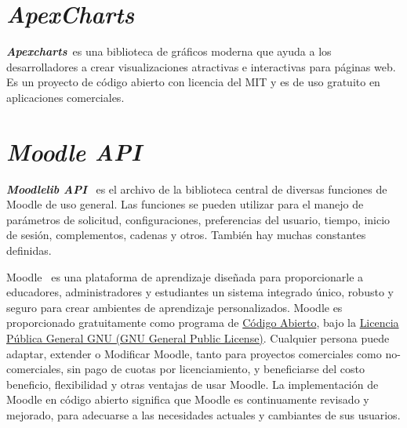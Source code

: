 \section{\textit{ApexCharts}}
\textbf{\textit{Apexcharts}}~\cite{ApexChart}es una biblioteca de gráficos moderna que ayuda a los desarrolladores a crear visualizaciones atractivas e interactivas para páginas web.
Es un proyecto de código abierto con licencia del MIT y es de uso gratuito en aplicaciones comerciales.

\section{\textit{Moodle API}}
\textbf{\textit{Moodlelib API}}~\cite{MoodleAPI} es el archivo de la biblioteca central de diversas funciones de Moodle de uso general. Las funciones se pueden utilizar para el manejo de parámetros de solicitud, configuraciones, preferencias del usuario, tiempo, inicio de sesión, complementos, cadenas y otros. También hay muchas constantes definidas.

Moodle~\cite{Moodle} es una plataforma de aprendizaje diseñada para proporcionarle a educadores, administradores y estudiantes un sistema integrado único, robusto y seguro para crear ambientes de aprendizaje personalizados. 
Moodle es proporcionado gratuitamente como programa de \href{https://opensource.org/docs/osd}{Código Abierto}, bajo la \href{https://docs.moodle.org/dev/License}{Licencia Pública General GNU (GNU General Public License)}. Cualquier persona puede adaptar, extender o Modificar Moodle, tanto para proyectos comerciales como no-comerciales, sin pago de cuotas por licenciamiento, y beneficiarse del costo beneficio, flexibilidad y otras ventajas de usar Moodle. La implementación de Moodle en código abierto significa que Moodle es continuamente revisado y mejorado, para adecuarse a las necesidades actuales y cambiantes de sus usuarios.


